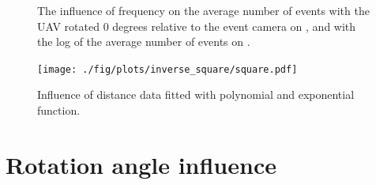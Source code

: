 \begin{figure}[H]
	\centering
	\caption{
  The influence of frequency on the average number of events with the UAV rotated 0 degrees relative to the event camera on , and with the log of the average number of events on .
  }
	\label{fig:freqs}
\end{figure}

\begin{figure}[H]
	\centering
	\texttt{[image: ./fig/plots/inverse\_square/square.pdf]}
	\caption{Influence of distance data fitted with polynomial and exponential function.}
	\label{fig:fit1}
\end{figure}

\section{Rotation angle influence}

